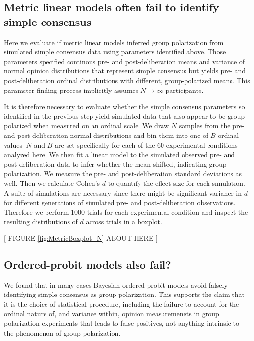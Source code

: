 \documentclass[11pt, letterpaper]{article}
\begin{document}
\subsection{Metric linear models often fail to identify simple consensus}

Here we evaluate if metric linear models inferred group polarization from simulated
simple consensus data using parameters identified above. Those parameters specified
continous pre- and post-deliberation means and variance of normal opinion
distributions that represent simple consensus but yields
pre- and post-deliberation ordinal distributions with different, group-polarized
means. This parameter-finding process implicitly assumes $N\to\infty$ participants.

It is therefore necessary to evaluate whether the simple consensus parameters so 
identified in the previous step yield simulated data that also appear to be
group-polarized when measured on an ordinal scale. We draw $N$ samples from the
pre- and post-deliberation normal distributions and bin them into one of 
$B$ ordinal values. $N$ and $B$ are set specifically for each of the 
60 experimental conditions analyzed here. We then fit a linear model to the 
simulated observed pre- and post-deliberation data to infer whether the mean
shifted, indicating group polarization. We measure the pre- and
post-deliberation standard deviations as well. Then we calculate Cohen's $d$
to quantify the effect size for each simulation. A suite of simulations are
necessary since there might be significant variance in $d$ for different
generations of simulated pre- and post-deliberation observations. Therefore we
perform 1000 trials for each experimental condition and inspect the resulting
distributions of $d$ across trials in a boxplot.



\vspace{0.5em}
\begin{center}
{[ FIGURE \ref{fig:MetricBoxplot_N} ABOUT HERE ]} \\
\end{center}


\subsection{Ordered-probit models also fail?}

We found that in many cases Bayesian ordered-probit models avoid falsely identifying simple
consensus as group polarization. This supports the claim that it is the choice of statistical
procedure, including the failure to account for the ordinal nature of, and variance within,
opinion measuremenets in group polarization experiments that leads to false
positives, not anything intrinsic to the phenomenon of group polarization.
\end{document}
